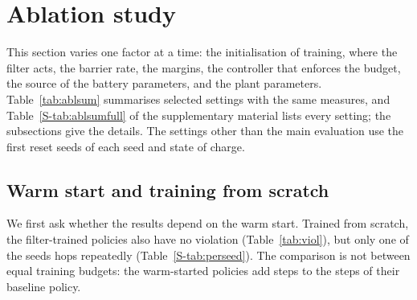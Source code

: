 \section{Ablation study}\label{sec:ablation}
This section varies one factor at a time: the initialisation of training, where the filter acts, the barrier rate, the margins, the controller that enforces the budget, the source of the battery parameters, and the plant parameters. Table~\ref{tab:ablsum} summarises selected settings with the same measures, and Table~\ref{S-tab:ablsumfull} of the supplementary material lists every setting; the subsections give the details. The settings other than the main evaluation use the first  reset seeds of each seed and state of charge.
\begin{table}[tbp]\centering\caption{Ablation summary, selected settings; policies trained with the filter unless the setting names another policy. Initialisation and filter placement: main evaluation ( episodes per seed and state of charge, warm-started policies for the placement); other factors: warm-started policies,  episodes per seed and state of charge. Violation: largest over the three states of charge of the mean over  seeds of the time below $V_{\min}$ and of the time above $I_{\lim}$; falls: count over seeds and states of charge; max height: mean over seeds at state of charge 0.2; filter active: fraction of substeps with the filter (or per-joint limit) active or infeasible, mean over states of charge. Plant variants: largest violation time and total falls over the  variants, and ranges over them. Every setting, with the two violation times separately: Table~\ref{S-tab:ablsumfull} of the supplementary material.}\label{tab:ablsum}
\end{table}

\subsection{Warm start and training from scratch}\label{sec:wsscratch}
We first ask whether the results depend on the warm start. Trained from scratch, the filter-trained policies also have no violation (Table~\ref{tab:viol}), but only one of the  seeds hops repeatedly (Table~\ref{S-tab:perseed}). The comparison is not between equal training budgets: the warm-started policies add  steps to the  steps of their baseline policy.


